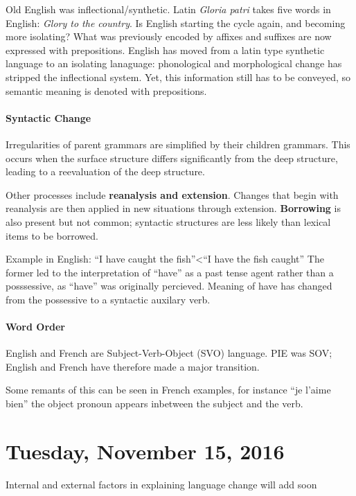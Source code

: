 \documentclass{exam}
\begin{document}
Old English was inflectional/synthetic. Latin \textit{Gloria patri} takes five words in English: \textit{Glory to the country}. 
Is English starting the cycle again, and becoming more isolating? 
What was previously encoded by affixes and suffixes are now expressed with prepositions.
English has moved from a latin type synthetic language to an isolating lanaguage: phonological and morphological change has stripped the inflectional system.
Yet, this information still has to be conveyed, so semantic meaning is denoted with prepositions. 




\paragraph{Syntactic Change}
Irregularities of parent grammars are simplified by their children grammars. 
This occurs when the surface structure differs significantly from the deep structure, leading to a reevaluation of the deep structure. 


Other processes include \textbf{reanalysis and extension}. 
Changes that begin with reanalysis are then applied in new situations through extension. 
\textbf{Borrowing} is also present but not common; syntactic structures are less likely than lexical items to be borrowed. 


Example in English:
``I have caught the fish''<``I have the fish caught''
The former led to the interpretation of ``have'' as a past tense agent rather than a posssessive, as ``have'' was originally percieved. 
Meaning of have has changed from the possessive to a syntactic auxilary verb. 


\paragraph{Word Order} English and French are  Subject-Verb-Object (SVO) language. 
PIE was SOV; English and French have therefore made a major transition.

Some remants of this can be seen in French examples, for instance ``je l'aime bien'' the object pronoun appears inbetween the subject and the verb. 



\section*{Tuesday, November 15, 2016}

Internal and external factors in explaining language change
will add soon 
\end{document}
